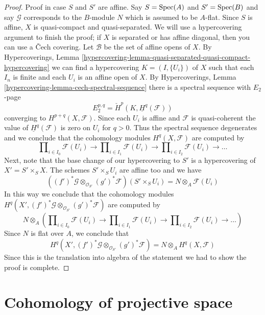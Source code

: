 \begin{proof}
\medskip\noindent
Proof in case $S$ and $S'$ are affine. Say $S = \mathop{\mathrm{Spec}}(A)$ and $S' = \mathop{\mathrm{Spec}}(B)$
and say $\mathcal{G}$ corresponds to the $B$-module $N$ which is assumed to be
$A$-flat. Since $S$ is affine, $X$ is quasi-compact and quasi-separated.
We will use a hypercovering argument to finish the proof; if $X$ is separated
or has affine diagonal, then you can use a {\v C}ech covering.
Let $\mathcal{B}$ be the set of affine opens of $X$. By
Hypercoverings,
Lemma \ref{hypercovering-lemma-quasi-separated-quasi-compact-hypercovering}
we can find a hypercovering $K = (I, \{U_i\})$ of $X$ such that each
$I_n$ is finite and each $U_i$ is an affine open of $X$. By
Hypercoverings, Lemma \ref{hypercovering-lemma-cech-spectral-sequence}
there is a spectral sequence with $E_2$-page
$$
E_2^{p, q} = \check{H}^p(K, \underline{H}^q(\mathcal{F}))
$$
converging to $H^{p + q}(X, \mathcal{F})$. Since each $U_i$ is affine
and $\mathcal{F}$ is quasi-coherent the value of
$\underline{H}^q(\mathcal{F})$ is zero on $U_i$ for $q > 0$. Thus the
spectral sequence degenerates and we conclude that the cohomology
modules $H^q(X, \mathcal{F})$ are computed by
$$
\prod\nolimits_{i \in I_0} \mathcal{F}(U_i)
\to
\prod\nolimits_{i \in I_1} \mathcal{F}(U_i)
\to
\prod\nolimits_{i \in I_2} \mathcal{F}(U_i)
\to \ldots
$$
Next, note that the base change of our hypercovering to
$S'$ is a hypercovering of $X' = S' \times_S X$.
The schemes $S' \times_S U_i$ are affine too
and we have
$$
\left((f')^*\mathcal{G} \otimes_{\mathcal{O}_{S'}} (g')^*\mathcal{F}\right)
(S' \times_S U_i) =
N \otimes_A \mathcal{F}(U_i)
$$
In this way we conclude that the cohomology modules
$H^q(X', (f')^*\mathcal{G} \otimes_{\mathcal{O}_{S'}} (g')^*\mathcal{F})$
are computed by
$$
N \otimes_A \left(
\prod\nolimits_{i \in I_0} \mathcal{F}(U_i)
\to
\prod\nolimits_{i \in I_1} \mathcal{F}(U_i)
\to
\prod\nolimits_{i \in I_2} \mathcal{F}(U_i)
\to \ldots
\right)
$$
Since $N$ is flat over $A$, we conclude that
$$
H^q(X', (f')^*\mathcal{G} \otimes_{\mathcal{O}_{S'}} (g')^*\mathcal{F})
=
N \otimes_A H^q(X, \mathcal{F})
$$
Since this is the translation into algebra of the statement
we had to show the proof is complete.
\end{proof}







\section{Cohomology of projective space}
\label{section-cohomology-projective-space}


